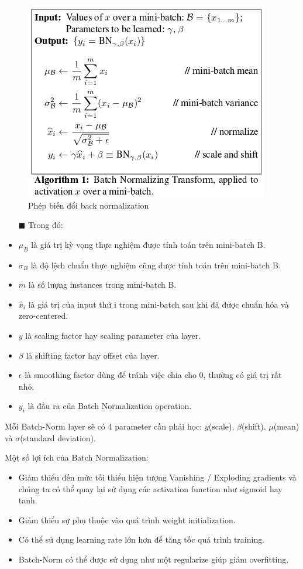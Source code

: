 \FloatBarrier
\begin{figure}[htp]
\begin{center}
\includegraphics[scale=0.8]{chap2/c2_figs/back_norm.png}
\end{center}
\caption{Phép biến đổi back normalization \cite{ioffe2015batch}}
\label{fig:back_norm}
\end{figure}
\FloatBarrier

\begin{itemize}
\item[$\blacksquare$] Trong đó:
\item $ \mu _B$ là giá trị kỳ vọng thực nghiệm được tính toán trên mini-batch B.
\item $\sigma_B$ là độ lệch chuẩn thực nghiệm cũng được tính toán trên mini-batch B.
\item $m$ là số lượng instances trong mini-batch B.
\item $\hat{x}_i $ là giá trị của input thứ i trong mini-batch sau khi đã được chuẩn hóa và zero-centered.
\item $y$ là scaling factor hay scaling parameter của layer.
\item $\beta$ là shifting factor hay offset của layer.
\item $\epsilon$ là smoothing factor dùng để tránh việc chia cho 0, thường có giá trị rất nhỏ.
\item $y_i$ là đầu ra của Batch Normalization operation.
\end{itemize}
Mỗi Batch-Norm layer sẽ có 4 parameter cần phải học:  $y$(scale),  $\beta$(shift),  $ \mu$(mean) và $\sigma$(standard deviation).

Một số lợi ích của Batch Normalization:
\begin{itemize}
\item Giảm thiểu đến mức tối thiểu hiện tượng Vanishing / Exploding gradients và chúng ta có thể quay lại sử dụng các activation function như sigmoid hay tanh.
\item Giảm thiểu sự phụ thuộc vào quá trình weight initialization.
\item Có thể sử dụng learning rate lớn hơn để tăng tốc quá trình training.
\item Batch-Norm có thể được sử dụng như một regularize giúp giảm overfitting.
\end{itemize}


